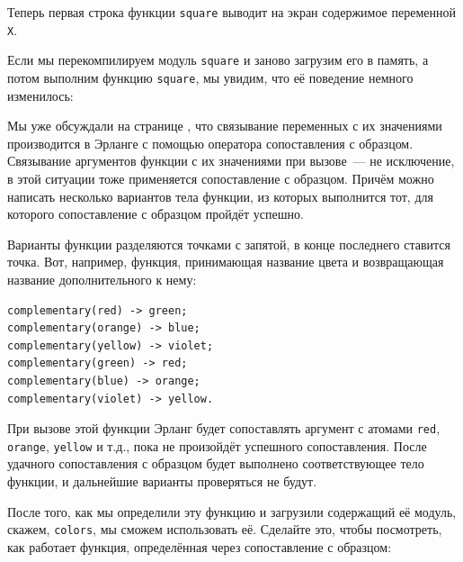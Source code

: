 \documentclass[
  paper=a4,
  fontsize=14pt,
  openany,
  appendixprefix=true
]{scrbook}
\begin{document}
Теперь первая строка функции \lstinline{square} выводит на экран содержимое переменной \lstinline{X}.

Если мы перекомпилируем модуль \lstinline{square} и заново загрузим его в память, а потом выполним функцию \lstinline{square}, мы увидим, что её поведение немного изменилось:

Мы уже обсуждали на странице \pageref{pattern_matching}, что связывание переменных с их значениями производится в Эрланге с помощью оператора сопоставления с образцом. Связывание аргументов функции с их значениями при вызове~--- не исключение, в этой ситуации тоже применяется сопоставление с образцом. Причём можно написать несколько вариантов тела функции, из которых выполнится тот, для которого сопоставление с образцом пройдёт успешно.

Варианты функции разделяются точками с запятой, в конце последнего ставится точка. Вот, например, функция, принимающая название цвета и возвращающая название дополнительного к нему:
\begin{lstlisting}
complementary(red) -> green;
complementary(orange) -> blue;
complementary(yellow) -> violet;
complementary(green) -> red;
complementary(blue) -> orange;
complementary(violet) -> yellow.
\end{lstlisting}


При вызове этой функции Эрланг будет сопоставлять аргумент с атомами \lstinline{red}, \lstinline{orange}, \lstinline{yellow} и т.д., пока не произойдёт успешного сопоставления. После удачного сопоставления с образцом будет выполнено соответствующее тело функции, и дальнейшие варианты проверяться не будут.

После того, как мы определили эту функцию и загрузили содержащий её модуль, скажем, \lstinline{colors}, мы сможем использовать её. Сделайте это, чтобы посмотреть, как работает функция, определённая через сопоставление с образцом:
\end{document}
